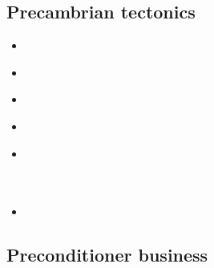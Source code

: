 \subsection{Precambrian tectonics}

\begin{scriptsize}
\begin{itemize}
\item[\nineteenninetyfour] 
\textcite{guto94} \\
\item[\twothousandthree] 
\textcite{wemv03} \\
\item[\twothousandten] 
\textcite{sigb10} \\
\item[\twothousandeleven] 
\textcite{pege11} \\
\item[\twothousandfourteen] 
\textcite{gery14} \\
\textcite{gagb14} \\
\textcite{sigb14} \\
\item[\twothousandtwenty] 
\textcite{poyd20} \\
\end{itemize}
\end{scriptsize}

\subsection{Preconditioner business}

\begin{scriptsize}
\cite{benz02}
\cite{bewa08}
\cite{urvs08}
\end{scriptsize}

